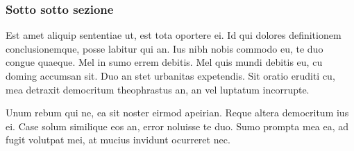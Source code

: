 \documentclass[11pt, a4paper, twoside, openright]{book}
\begin{document}
\subsubsection{Sotto sotto sezione}
Est amet aliquip sententiae ut, est tota oportere ei. Id qui dolores
definitionem conclusionemque, posse labitur qui an. Ius nibh nobis commodo eu,
te duo congue quaeque. Mel in sumo errem debitis. Mel quis mundi debitis eu, cu
doming accumsan sit. Duo an stet urbanitas expetendis. Sit oratio eruditi cu,
mea detraxit democritum theophrastus an, an vel luptatum incorrupte.

Unum rebum qui ne, ea sit noster eirmod apeirian. Reque altera democritum ius
ei. Case solum similique eos an, error noluisse te duo. Sumo prompta mea ea, ad
fugit volutpat mei, at mucius invidunt ocurreret nec.
\end{document}
